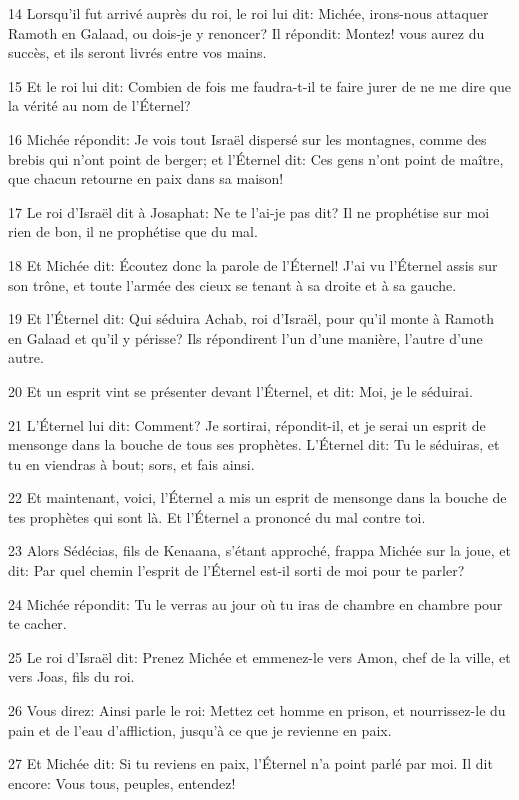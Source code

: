 \par 14 Lorsqu'il fut arrivé auprès du roi, le roi lui dit: Michée, irons-nous attaquer Ramoth en Galaad, ou dois-je y renoncer? Il répondit: Montez! vous aurez du succès, et ils seront livrés entre vos mains.
\par 15 Et le roi lui dit: Combien de fois me faudra-t-il te faire jurer de ne me dire que la vérité au nom de l'Éternel?
\par 16 Michée répondit: Je vois tout Israël dispersé sur les montagnes, comme des brebis qui n'ont point de berger; et l'Éternel dit: Ces gens n'ont point de maître, que chacun retourne en paix dans sa maison!
\par 17 Le roi d'Israël dit à Josaphat: Ne te l'ai-je pas dit? Il ne prophétise sur moi rien de bon, il ne prophétise que du mal.
\par 18 Et Michée dit: Écoutez donc la parole de l'Éternel! J'ai vu l'Éternel assis sur son trône, et toute l'armée des cieux se tenant à sa droite et à sa gauche.
\par 19 Et l'Éternel dit: Qui séduira Achab, roi d'Israël, pour qu'il monte à Ramoth en Galaad et qu'il y périsse? Ils répondirent l'un d'une manière, l'autre d'une autre.
\par 20 Et un esprit vint se présenter devant l'Éternel, et dit: Moi, je le séduirai.
\par 21 L'Éternel lui dit: Comment? Je sortirai, répondit-il, et je serai un esprit de mensonge dans la bouche de tous ses prophètes. L'Éternel dit: Tu le séduiras, et tu en viendras à bout; sors, et fais ainsi.
\par 22 Et maintenant, voici, l'Éternel a mis un esprit de mensonge dans la bouche de tes prophètes qui sont là. Et l'Éternel a prononcé du mal contre toi.
\par 23 Alors Sédécias, fils de Kenaana, s'étant approché, frappa Michée sur la joue, et dit: Par quel chemin l'esprit de l'Éternel est-il sorti de moi pour te parler?
\par 24 Michée répondit: Tu le verras au jour où tu iras de chambre en chambre pour te cacher.
\par 25 Le roi d'Israël dit: Prenez Michée et emmenez-le vers Amon, chef de la ville, et vers Joas, fils du roi.
\par 26 Vous direz: Ainsi parle le roi: Mettez cet homme en prison, et nourrissez-le du pain et de l'eau d'affliction, jusqu'à ce que je revienne en paix.
\par 27 Et Michée dit: Si tu reviens en paix, l'Éternel n'a point parlé par moi. Il dit encore: Vous tous, peuples, entendez!
